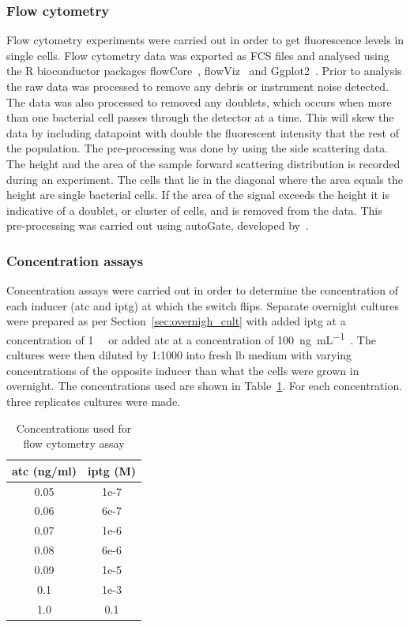 \subsubsection{Flow cytometry}
Flow cytometry experiments were carried out in order to get fluorescence levels in single cells. Flow cytometry data was exported as FCS files and analysed using the R bioconductor packages flowCore~\autocite{flowCore:man}, flowViz~\autocite{flowViz:man} and Ggplot2~\autocite{ggplot2:bk}. Prior to analysis the raw data was processed to remove any debris or instrument noise detected. The data was also processed to removed any doublets, which occurs when more than one bacterial  cell passes through the detector at a time. This will skew the data by including datapoint with double the fluorescent intensity that the rest of the population. The pre-processing was done by using the side scattering data. The height and the area of the sample forward scattering distribution is recorded during an experiment. The cells that lie in the diagonal where the area equals the height are single bacterial cells. If the area of the signal exceeds the height it is indicative of a doublet, or cluster of cells, and is removed from the data. This pre-processing was carried out using autoGate, developed by~\textcite{Fedorec2016}. 



\subsubsection{Concentration assays}
\label{sec:flo_conc}
Concentration assays were carried out in order to determine the concentration of each inducer (\acrshort{atc} and \acrshort{iptg}) at which the switch flips.  Separate overnight cultures were prepared as per Section~\ref{sec:overnigh_cult} with added \acrshort{iptg} at a concentration of \SI{1}{\milli\molar} or added \acrshort{atc} at a concentration of \SI{100}{\nano\gram\per\milli\liter}~\autocite{Litcofsky:2012gr}. The cultures were then diluted by 1:1000 into fresh \acrshort{lb} medium with varying concentrations of the opposite inducer than what the cells were grown in overnight. The concentrations used are shown in Table~\ref{tab:flow_conc}. For each concentration. three replicates cultures were made.


\begin{table}[tb]
\centering
\caption{Concentrations used for flow cytometry assay}
\label{tab:flow_conc}
\begin{tabular}{@{}cc@{}}
\toprule
\acrshort{atc} (ng/ml)  & \acrshort{iptg} (M) \\ \midrule
0.05 & 1e-7 \\
0.06 & 6e-7 \\
0.07 & 1e-6 \\
0.08 & 6e-6 \\
0.09 & 1e-5 \\
0.1  & 1e-3 \\
1.0  & 0.1  \\ \bottomrule
\end{tabular}
\end{table}

